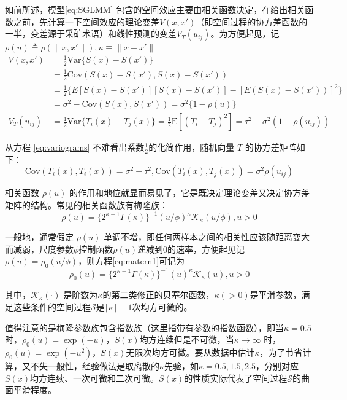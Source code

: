 \documentclass[hyperref, a4paper, UTF8, zihao = -4, linespread = 1.25, scheme = chinese]{ctexbook}
\begin{document}
如前所述，模型\eqref{eq:SGLMM}
包含的空间效应主要由相关函数决定，在给出相关函数之前，先计算一下空间效应的理论变差\(V(x,x')\)（即空间过程的协方差函数的一半，变差源于采矿术语）和线性预测的变差\(V_{T}(u_{ij})\)。为方便起见，记\(\rho(u) \triangleq \rho(\|x,x'\|),u \equiv \|x-x'\|\)
\begin{equation}
\begin{aligned}
V(x,x')&=\frac{1}{2}\mathrm{Var}\{S(x)-S(x')\}\\
&=\frac{1}{2}\mathrm{Cov}(S(x)-S(x'),S(x)-S(x'))\\
&=\frac{1}{2}\{E[S(x)-S(x')][S(x)-S(x')]-[E(S(x)-S(x'))]^2\}\\
&=\sigma^2-\mathrm{Cov}(S(x),S(x'))=\sigma^2\{1-\rho(u)\}\\
V_{T}(u_{ij})&=\frac{1}{2}\mathrm{Var}\{T_{i}(x)-T_{j}(x)\}
=\frac{1}{2}\mathrm{E}[(T_{i}-T_{j})^2]=\tau^2+\sigma^2(1-\rho(u_{ij})) \label{eq:variograms}
\end{aligned}
\end{equation}

从方程 \eqref{eq:variograms}
不难看出系数\(\frac{1}{2}\)的化简作用，随机向量 \(T\)
的协方差矩阵如下：\[\mathrm{Cov}(T_{i}(x),T_{i}(x)) = \sigma^2+\tau^2, \mathrm{Cov}(T_{i}(x),T_{j}(x))=\sigma^2\rho(u_{ij})\]

相关函数 \(\rho(u)\)
的作用和地位就显而易见了，它是既决定理论变差又决定协方差矩阵的结构。常见的相关函数族有梅隆族：\begin{equation}
\rho(u)=\{2^{\kappa -1}\Gamma(\kappa)\}^{-1}(u/\phi)^{\kappa}\mathcal{K}_{\kappa}(u/\phi),u > 0 \label{eq:matern1}
\end{equation}

一般地，通常假定 \(\rho(u)\)
单调不增，即任何两样本之间的相关性应该随距离变大而减弱，尺度参数\(\phi\)控制函数\(\rho(u)\)递减到0的速率，方便起见记
\(\rho(u) = \rho_{0}(u/\phi)\)，则方程\eqref{eq:matern1}可记为\begin{equation}
\rho_{0}(u)=\{2^{\kappa -1}\Gamma(\kappa)\}^{-1}(u)^{\kappa}\mathcal{K}_{\kappa}(u),u > 0 \label{eq:matern2}
\end{equation}

其中，\(\mathcal{K}_{\kappa}(\cdot)\)
是阶数为\(\kappa\)的第二类修正的贝塞尔函数，\(\kappa(>0)\)是平滑参数，满足这些条件的空间过程\(\mathcal{S}\)是\(\lceil\kappa\rceil-1\)次均方可微的。

值得注意的是梅隆参数族包含指数族（这里指带有参数的指数函数），即当\(\kappa=0.5\)时，\(\rho_{0}(u)=\exp(-u)\)，\(S(x)\)均方连续但是不可微，当\(\kappa \to \infty\)
时，\(\rho_{0}(u)=\exp(-u^2)\)，\(S(x)\)无限次均方可微。要从数据中估计\(\kappa\)，为了节省计算，又不失一般性，经验做法是取离散的\(\kappa\)先验，如\(\kappa=0.5,1.5,2.5\)，分别对应\(S(x)\)均方连续、一次可微和二次可微。\(S(x)\)的性质实际代表了空间过程\(\mathcal{S}\)的曲面平滑程度。
\end{document}
